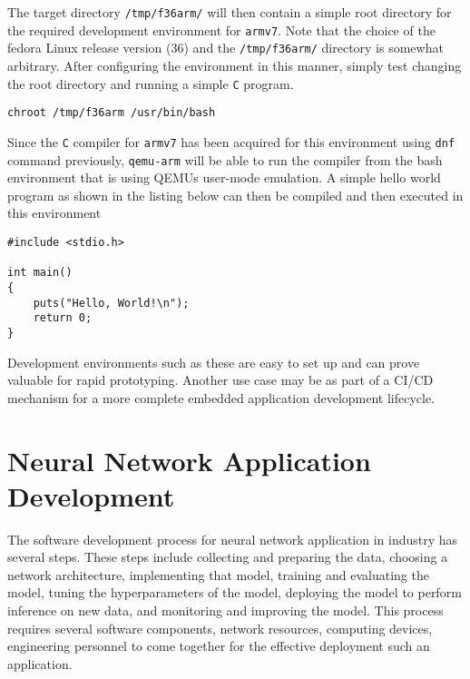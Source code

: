 The target directory \texttt{/tmp/f36arm/} will then contain a simple root directory for the required development environment for \texttt{armv7}. Note that the choice of the fedora Linux release version (36) and the \texttt{/tmp/f36arm/} directory is somewhat arbitrary. After configuring the environment in this manner, simply test changing the root directory and running a simple \texttt{C} program.

\begin{verbatim}
chroot /tmp/f36arm /usr/bin/bash
\end{verbatim}

Since the \texttt{C} compiler for \texttt{armv7} has been acquired for this environment using \texttt{dnf} command previously, \texttt{qemu-arm} will be able to run the compiler from the bash environment that is using QEMU\textquotesingle s user-mode emulation. A simple hello world program as shown in the listing below can then be compiled and then executed in this environment

\begin{verbatim}
#include <stdio.h>

int main()
{
	puts("Hello, World!\n");
	return 0;
}
\end{verbatim}

Development environments such as these are easy to set up and can prove valuable for rapid prototyping. Another use case may be as part of a CI/CD mechanism for a more complete embedded application development lifecycle.

\section{Neural Network Application Development}

The software development process for neural network application in industry has several steps. These steps include collecting and preparing the data, choosing a network architecture, implementing that model, training and evaluating the model, tuning the hyperparameters of the model, deploying the model to perform inference on new data, and monitoring and improving the model. This process requires several software components, network resources, computing devices, engineering personnel to come together for the effective deployment such an application.

